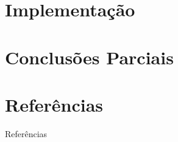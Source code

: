 \documentclass[xcolor=table]{beamer}
\begin{document}
    \section[]{Implementação}
    
    
    
    
    

    \section[]{Conclusões Parciais}
    
    
    

    \section[]{Referências}
    \begin{frame}[allowframebreaks]{Referências}
        
    \end{frame}
\end{document}

